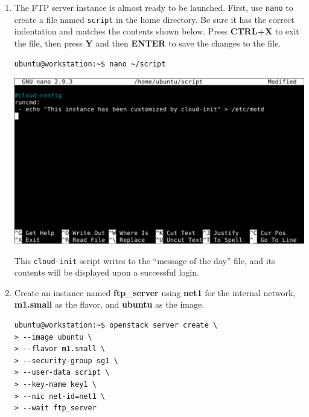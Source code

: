 \documentclass[letterpaper, 12pt]{article}
\begin{document}
\begin{enumerate}
    \item The FTP server instance is almost ready to be launched. First, use \texttt{nano} to create a file named
    \texttt{script} in the home directory. Be sure it has the correct indentation and matches the contents shown below.
    Press \textbf{CTRL+X} to exit the file, then press \textbf{Y} and then \textbf{ENTER} to save the changes to the
    file.
\begin{lstlisting}
ubuntu@workstation:~$ nano ~/script
\end{lstlisting}

    \begin{center}
        \includegraphics[width=\linewidth]{images/part1/step32.png}
    \end{center}

    \begin{notebox}{}
        This \texttt{cloud-init} script writes to the ``message of the day'' file, and its contents will be displayed
        upon a successful login.
    \end{notebox}

    \item Create an instance named \textbf{ftp\_server} using \textbf{net1} for the internal network, \textbf{m1.small}
    as the flavor, and \textbf{ubuntu} as the image.
\begin{lstlisting}
ubuntu@workstation:~$ openstack server create \
> --image ubuntu \
> --flavor m1.small \
> --security-group sg1 \
> --user-data script \
> --key-name key1 \
> --nic net-id=net1 \
> --wait ftp_server
\end{lstlisting}


\end{enumerate}
\end{document}

